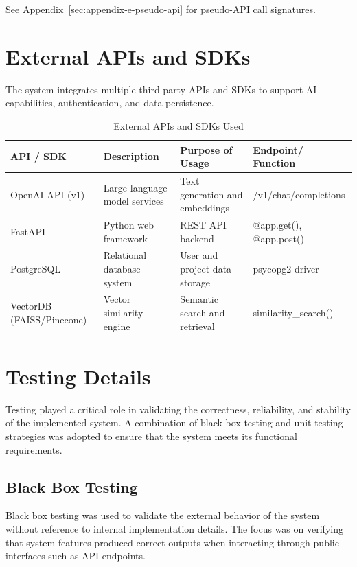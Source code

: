 See Appendix~\ref{sec:appendix-e-pseudo-api} for pseudo-API call signatures.

\section{External APIs and SDKs}
\label{sec:external-apis}

The system integrates multiple third-party APIs and SDKs to support AI capabilities, authentication, and data persistence.

\begin{table}[H]
\centering
\begin{tabular}{|p{3cm}|p{4cm}|p{4cm}|p{3cm}|}
\hline
\textbf{API / SDK} & \textbf{Description} & \textbf{Purpose of Usage} & \textbf{Endpoint/ Function} \\
\hline
OpenAI API (v1) & Large language model services & Text generation and embeddings & /v1/chat/completions \\
\hline
FastAPI & Python web framework & REST API backend & @app.get(), @app.post() \\
\hline
PostgreSQL & Relational database system & User and project data storage & psycopg2 driver \\
\hline
VectorDB (FAISS/Pinecone) & Vector similarity engine & Semantic search and retrieval & similarity\_search() \\
\hline
\end{tabular}
\caption{External APIs and SDKs Used}
\end{table}

\section{Testing Details}
\label{sec:testing-details}

Testing played a critical role in validating the correctness, reliability, and stability of the implemented system. A combination of black box testing and unit testing strategies was adopted to ensure that the system meets its functional requirements.

\subsection{Black Box Testing}
\label{subsec:blackbox-testing}

Black box testing was used to validate the external behavior of the system without reference to internal implementation details. The focus was on verifying that system features produced correct outputs when interacting through public interfaces such as API endpoints.

